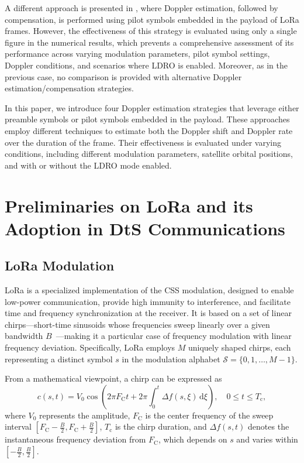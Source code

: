 \documentclass{IEEEtran}
\begin{document}
A different approach is presented in \cite{9943752}, where Doppler estimation, followed by compensation, is performed using pilot symbols embedded in the payload of \ac{LoRa} frames. However, the effectiveness of this strategy is evaluated using only a single figure in the numerical results, which prevents a comprehensive assessment of its performance across varying modulation parameters, pilot symbol settings, Doppler conditions, and scenarios where \ac{LDRO} is enabled.  Moreover, as in the previous case, no comparison is provided with alternative Doppler estimation/compensation strategies.

In this paper, we introduce four Doppler estimation strategies that leverage either preamble symbols or pilot symbols embedded in the payload. These approaches employ different techniques to estimate both the Doppler shift and Doppler rate over the duration of the frame. Their effectiveness is evaluated under varying conditions, including different modulation parameters, satellite orbital positions, and with or without the \ac{LDRO} mode enabled.

\section{Preliminaries on LoRa and its Adoption in \ac{DtS} Communications} \label{sec:preliminaries}

\subsection{LoRa Modulation} \label{ssec:lora_signal}

\ac{LoRa} is a specialized implementation of the \ac{CSS} modulation, designed to enable low-power communication, provide high immunity to interference, and facilitate time and frequency synchronization at the receiver. It is based on a set of linear chirps---short-time sinusoids whose frequencies sweep linearly over a given bandwidth $B$~\cite{Pasolini.2022, Ullah.2024}---making it a particular case of frequency modulation with linear frequency deviation. Specifically, \ac{LoRa} employs $M$ uniquely shaped chirps, each representing a distinct symbol $s$ in the modulation alphabet ${\mathcal{S} = \{0, 1, \dots, M-1\}}$.

From a mathematical viewpoint, a chirp can be expressed as~\cite{Pasolini.2022}
\begin{equation}
    c(s, t) = V_0 \cos\left(2 \pi F_\mathrm{C} t + 2 \pi \int_0^{t} \Delta f(s, \xi) \, \mathrm{d} \xi \right), \quad 0 \leq t \leq T_\text{c},
    \label{eq:chirp_equation}
\end{equation}
where $V_0$ represents the amplitude, $F_\mathrm{C}$ is the center frequency of the sweep interval $\left[F_\mathrm{C} - \frac{B}{2}, F_\mathrm{C} + \frac{B}{2}\right]$,  $T_\text{c}$ is the chirp duration, and $\Delta f(s, t)$ denotes the instantaneous frequency deviation from $F_\mathrm{C}$, which depends on $s$ and varies within $\left[-\frac{B}{2}, \frac{B}{2}\right]$. 
\end{document}
